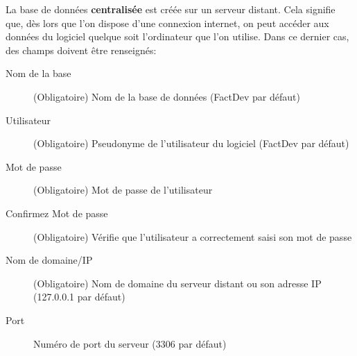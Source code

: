 La base de donn\'ees \textbf{centralis\'ee} est cr\'e\'ee sur un serveur distant. Cela signifie que, d\`es lors que l'on dispose d'une connexion internet, on peut acc\'eder aux donn\'ees du logiciel quelque soit l'ordinateur que l'on utilise. 
Dans ce dernier cas, des champs doivent \^etre renseign\'es: \\
\begin{description}
	\item[Nom de la base] (Obligatoire) Nom de la base de donn\'ees (FactDev par d\'efaut)
	\item[Utilisateur] (Obligatoire) Pseudonyme de l'utilisateur du logiciel (FactDev par d\'efaut)
	\item[Mot de passe] (Obligatoire) Mot de passe de l'utilisateur
	\item[Confirmez Mot de passe] (Obligatoire) V\'erifie que l'utilisateur a correctement saisi son mot de passe
	\item[Nom de domaine/IP] (Obligatoire) Nom de domaine du serveur distant ou son adresse IP (127.0.0.1 par d\'efaut)
	\item[Port] Num\'ero de port du serveur (3306 par d\'efaut)
\end{description} 

